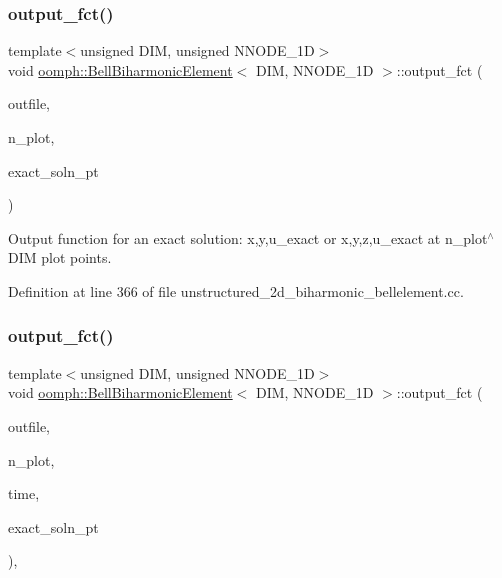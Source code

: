 \subsubsection{\texorpdfstring{output\+\_\+fct()}{output\_fct()}\hspace{0.1cm}{\footnotesize\ttfamily [1/2]}}
{\footnotesize\ttfamily template$<$unsigned D\+IM, unsigned N\+N\+O\+D\+E\+\_\+1D$>$ \\
void \hyperlink{classoomph_1_1BellBiharmonicElement}{oomph\+::\+Bell\+Biharmonic\+Element}$<$ D\+IM, N\+N\+O\+D\+E\+\_\+1D $>$\+::output\+\_\+fct (\begin{DoxyParamCaption}\item[{std\+::ostream \&}]{outfile,  }\item[{const unsigned \&}]{n\+\_\+plot,  }\item[{Finite\+Element\+::\+Steady\+Exact\+Solution\+Fct\+Pt}]{exact\+\_\+soln\+\_\+pt }\end{DoxyParamCaption})\hspace{0.3cm}{\ttfamily [inline]}}



Output function for an exact solution\+: x,y,u\+\_\+exact or x,y,z,u\+\_\+exact at n\+\_\+plot$^\wedge$\+D\+IM plot points. 



Definition at line 366 of file unstructured\+\_\+2d\+\_\+biharmonic\+\_\+bellelement.\+cc.

\mbox{\label{classoomph_1_1BellBiharmonicElement_a35c7af5c86baeb3787eaf87e2401ea6c}} 
\subsubsection{\texorpdfstring{output\+\_\+fct()}{output\_fct()}\hspace{0.1cm}{\footnotesize\ttfamily [2/2]}}
{\footnotesize\ttfamily template$<$unsigned D\+IM, unsigned N\+N\+O\+D\+E\+\_\+1D$>$ \\
void \hyperlink{classoomph_1_1BellBiharmonicElement}{oomph\+::\+Bell\+Biharmonic\+Element}$<$ D\+IM, N\+N\+O\+D\+E\+\_\+1D $>$\+::output\+\_\+fct (\begin{DoxyParamCaption}\item[{std\+::ostream \&}]{outfile,  }\item[{const unsigned \&}]{n\+\_\+plot,  }\item[{const double \&}]{time,  }\item[{Finite\+Element\+::\+Unsteady\+Exact\+Solution\+Fct\+Pt}]{exact\+\_\+soln\+\_\+pt }\end{DoxyParamCaption})\hspace{0.3cm}{\ttfamily [inline]}, {\ttfamily [virtual]}}



